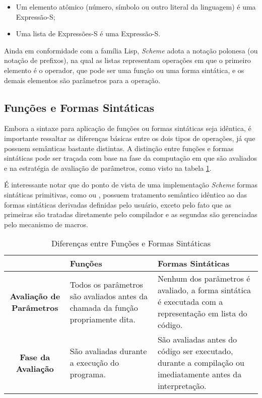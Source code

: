 \begin{itemize}

\item Um elemento atômico (número, símbolo ou outro literal da linguagem) é uma
Expressão-S;

\item Uma lista de Expressões-S é uma Expressão-S.

\end{itemize}

Ainda em conformidade com a família Lisp, \textit{Scheme} adota a notação
polonesa (ou notação de prefixos), na qual as listas representam operações em
que o primeiro elemento é o operador, que pode ser uma função ou uma forma
sintática, e os demais elementos são parâmetros para a operação.

\subsection{Funções e Formas Sintáticas}

Embora a sintaxe para aplicação de funções ou formas sintáticas seja idêntica,
é importante ressaltar as diferenças básicas entre os dois tipos de operações,
já que possuem semânticas bastante distintas. A distinção entre funções e
formas sintáticas pode ser traçada com base na fase da computação em que são
avaliados e na estratégia de avaliação de parâmetros, como visto na tabela
\ref{table:functions-vs-special-forms}.

É interessante notar que do ponto de vista de uma implementação \textit{Scheme}
formas sintáticas primitivas, como  ou , possuem
tratamento semântico idêntico ao das formas sintáticas derivadas definidas pelo
usuário, exceto pelo fato que as primeiras são tratadas diretamente pelo
compilador e as segundas são gerenciadas pelo mecanismo de macros.

\begin{table}[h!]
 \begin{center}
  \begin{tabular} { | c | p{4cm} | p{4cm} | }
   \hline
                        & \textbf{Funções} & \textbf{Formas Sintáticas} \\ \hline
    \textbf{Avaliação de Parâmetros} & Todos os parâmetros são avaliados antes da chamada da função propriamente dita. & Nenhum dos parâmetros é avaliado, a forma sintática é executada com a representação em lista do código. \\ \hline
    \textbf{Fase da Avaliação} & São avaliadas durante a execução do programa. & São avaliadas antes do código ser executado, durante a compilação ou imediatamente antes da interpretação. \\ \hline
  \end{tabular}
 \end{center}
 \caption{Diferenças entre Funções e Formas Sintáticas} 
 \label{table:functions-vs-special-forms}
\end{table}

